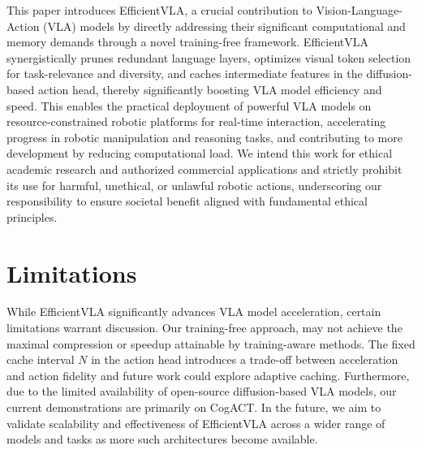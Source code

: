 This paper introduces EfficientVLA, a crucial contribution to Vision-Language-Action (VLA) models by directly addressing their significant computational and memory demands through a novel training-free framework. EfficientVLA synergistically prunes redundant language layers, optimizes visual token selection for task-relevance and diversity, and caches intermediate features in the diffusion-based action head, thereby significantly boosting VLA model efficiency and speed. This enables the practical deployment of powerful VLA models on resource-constrained robotic platforms for real-time interaction, accelerating progress in robotic manipulation and reasoning tasks, and contributing to more development by reducing computational load. We intend this work for ethical academic research and authorized commercial applications and strictly prohibit its use for harmful, unethical, or unlawful robotic actions, underscoring our responsibility to ensure societal benefit aligned with fundamental ethical principles.

\section{Limitations}

While EfficientVLA significantly advances VLA model acceleration, certain limitations warrant discussion. Our training-free approach, may not achieve the maximal compression or speedup attainable by training-aware methods. The fixed cache interval $N$ in the action head introduces a trade-off between acceleration and action fidelity and future work could explore adaptive caching. Furthermore, due to the limited availability of open-source diffusion-based VLA models, our current demonstrations are primarily on CogACT. In the future, we aim to validate scalability and effectiveness of EfficientVLA across a wider range of models and tasks as more such architectures become available.